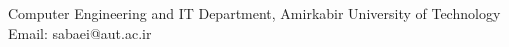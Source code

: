 \documentclass[11pt,a4paper,sans]{moderncv} %
\begin{document}
{Computer Engineering and IT Department, Amirkabir University of Technology\\
	Email: sabaei@aut.ac.ir
}


%
%




\end{document}
